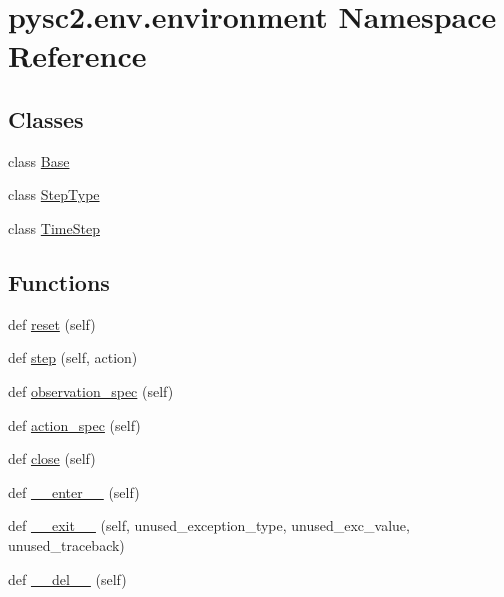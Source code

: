 \hypertarget{namespacepysc2_1_1env_1_1environment}{}\section{pysc2.\+env.\+environment Namespace Reference}
\label{namespacepysc2_1_1env_1_1environment}
\subsection*{Classes}
\begin{DoxyCompactItemize}
\item 
class \mbox{\hyperlink{classpysc2_1_1env_1_1environment_1_1_base}{Base}}
\item 
class \mbox{\hyperlink{classpysc2_1_1env_1_1environment_1_1_step_type}{Step\+Type}}
\item 
class \mbox{\hyperlink{classpysc2_1_1env_1_1environment_1_1_time_step}{Time\+Step}}
\end{DoxyCompactItemize}
\subsection*{Functions}
\begin{DoxyCompactItemize}
\item 
def \mbox{\hyperlink{namespacepysc2_1_1env_1_1environment_ac382d147632a99ed4f259f8f0359d1c2}{reset}} (self)
\item 
def \mbox{\hyperlink{namespacepysc2_1_1env_1_1environment_a33a961f4eae86ee2fd8faf7bfa56ec28}{step}} (self, action)
\item 
def \mbox{\hyperlink{namespacepysc2_1_1env_1_1environment_a0fee225a83b098e54d402bb36016a26c}{observation\+\_\+spec}} (self)
\item 
def \mbox{\hyperlink{namespacepysc2_1_1env_1_1environment_a74074388916b1ee75fe907ba1ef89cd9}{action\+\_\+spec}} (self)
\item 
def \mbox{\hyperlink{namespacepysc2_1_1env_1_1environment_a12f1f831e94b51902434a752e0b2785f}{close}} (self)
\item 
def \mbox{\hyperlink{namespacepysc2_1_1env_1_1environment_a896e68af7de52dfdd215668735cb8a05}{\+\_\+\+\_\+enter\+\_\+\+\_\+}} (self)
\item 
def \mbox{\hyperlink{namespacepysc2_1_1env_1_1environment_a2d6e14089315a0f114774a210e08737a}{\+\_\+\+\_\+exit\+\_\+\+\_\+}} (self, unused\+\_\+exception\+\_\+type, unused\+\_\+exc\+\_\+value, unused\+\_\+traceback)
\item 
def \mbox{\hyperlink{namespacepysc2_1_1env_1_1environment_adb20b87cd19dde16fe8b2b12d1bf2a7d}{\+\_\+\+\_\+del\+\_\+\+\_\+}} (self)
\end{DoxyCompactItemize}


